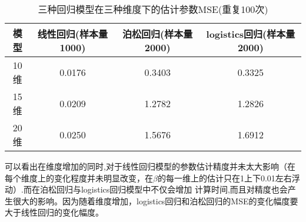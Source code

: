 \begin{table}[htbp]
    \centering
    \caption{三种回归模型在三种维度下的估计参数MSE(重复100次)}
    \label{tab:compare_mse}
    \begin{tabular}{c|c|c|c}
    \hline
    模型  & 线性回归(样本量1000) & 泊松回归(样本量2000) & logistics回归(样本量2000) \\ \hline
    10维 & 0.0176        & 0.3403        & 0.3325               \\ \hline
    15维 & 0.0209        & 1.2782        & 1.2826               \\ \hline
    20维 & 0.0250        & 1.5676        & 1.6912               \\ \hline
    \end{tabular}
    \end{table}


可以看出在维度增加的同时,对于线性回归模型的参数估计精度并未太大影响（在每个维度上的变化程度并未明显改变，在$\beta$的每一维上的估计只在1上下0.01左右浮动）.而在泊松回归与logistics回归模型中不仅会增加
计算时间,而且对精度也会产生很大的影响。因为随着维度增加，logistics回归和泊松回归的MSE的变化幅度要大于线性回归的变化幅度。